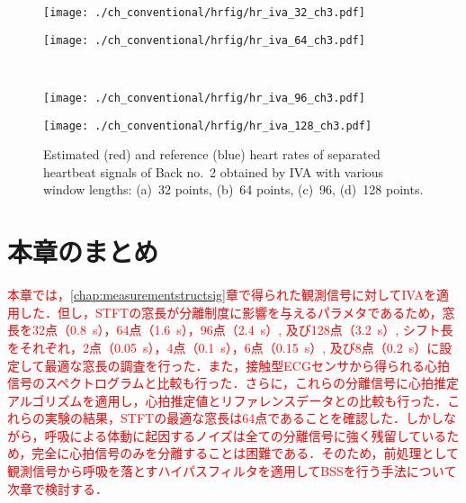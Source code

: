 \begin{figure}[htbp]
      \begin{minipage}[t]{0.45\hsize}
        \centering
        \texttt{[image: ./ch\_conventional/hrfig/hr\_iva\_32\_ch3.pdf]}
        \label{fig:hriva32ch3}
      \end{minipage} 
      \begin{minipage}[t]{0.45\hsize}
        \centering
        \texttt{[image: ./ch\_conventional/hrfig/hr\_iva\_64\_ch3.pdf]}
        \label{fig:hriva64ch3}
      \end{minipage} \\
   
      \begin{minipage}[t]{0.45\hsize}
        \centering
        \texttt{[image: ./ch\_conventional/hrfig/hr\_iva\_96\_ch3.pdf]}
        \label{fig:hriva96ch3}
      \end{minipage} 
      \begin{minipage}[t]{0.45\hsize}
        \centering
        \texttt{[image: ./ch\_conventional/hrfig/hr\_iva\_128\_ch3.pdf]}
        \label{fig:hriva128ch3}
      \end{minipage} 
     \caption{Estimated (red) and reference (blue) heart rates of separated heartbeat signals of Back no.~2 obtained by IVA with various window lengths: (a)~32 points, (b)~64 points, (c)~96, (d)~128 points.}
     \label{fig:hrivawinlen}
  \end{figure}

\section{本章のまとめ}
\textcolor{red}{本章では，\ref{chap:measurementstructsig}章で得られた観測信号に対してIVAを適用した．但し，STFTの窓長が分離制度に影響を与えるパラメタであるため，窓長を32点（0.8~s），64点（1.6~s），96点（2.4~s）, 及び128点（3.2~s）, シフト長をそれぞれ，2点（0.05~s），4点（0.1~s），6点（0.15~s）, 及び8点（0.2~s）に設定して最適な窓長の調査を行った．また，接触型ECGセンサから得られる心拍信号のスペクトログラムと比較も行った．さらに，これらの分離信号に心拍推定アルゴリズムを適用し，心拍推定値とリファレンスデータとの比較も行った．これらの実験の結果，STFTの最適な窓長は64点であることを確認した．しかしながら，呼吸による体動に起因するノイズは全ての分離信号に強く残留しているため，完全に心拍信号のみを分離することは困難である．そのため，前処理として観測信号から呼吸を落とすハイパスフィルタを適用してBSSを行う手法について次章で検討する．}


